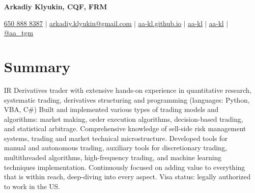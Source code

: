 \documentclass[a4paper,hidelinks]{article}
\begin{document}

\begin{center}
  \textbf{\Huge{Arkadiy Klyukin, CQF, FRM}} \\ \vspace{4pt}
 
  \small
  \faMobile* \hspace{.5pt} \href{tel:+16508888387}{650 888 8387}
  $|$
  \faAt \hspace{.5pt} \href{mailto:arkadiy.klyukin@gmail.com}{arkadiy.klyukin@gmail.com}
  $|$
  \faGlobeAmericas \hspace{.5pt} \href{https://aa-kl.github.io}{aa-kl.github.io}
  $|$
  \faGithub \hspace{.5pt} \href{https://github.com/aa-kl}{aa-kl}
  $|$
  \faLinkedinIn \hspace{.5pt} \href{https://www.linkedin.com/in/aa-kl}{aa-kl}
  $|$
  \faTelegramPlane \hspace{.5pt} \href{https://t.me/aa_tgm}{@aa\_tgm}
\end{center}

\vspace{-12pt}
\section{Summary}
IR Derivatives trader with extensive hands-on experience in quantitative research, systematic trading, derivatives structuring and programming (languages: Python, VBA, C\#) Built and implemented various types of trading models and algorithms: market making, order execution algorithms, decision-based trading, and statistical arbitrage. Comprehensive knowledge of sell-side risk management systems,  trading and market technical microstructure. Developed tools for manual and autonomous trading, auxiliary tools for discretionary trading, multithreaded algorithms, high-frequency trading, and machine learning techniques implementation. Continuously focused on adding value to everything that is within reach, deep-diving into every aspect. Visa status: legally authorized to work in the US.\\
\end{document}
